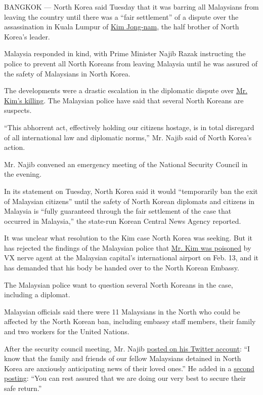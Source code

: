BANGKOK --- North Korea said Tuesday that it was barring all Malaysians
from leaving the country until there was a ``fair settlement'' of a
dispute over the assassination in Kuala Lumpur of
\href{https://www.nytimes.com/2017/02/15/world/asia/kim-jong-nam-assassination-north-korea.html}{Kim
Jong-nam}, the half brother of North Korea's leader.

Malaysia responded in kind, with Prime Minister Najib Razak instructing
the police to prevent all North Koreans from leaving Malaysia until he
was assured of the safety of Malaysians in North Korea.

The developments were a drastic escalation in the diplomatic dispute
over
\href{https://www.nytimes.com/2017/02/22/world/asia/kim-jong-nam-assassination-korea-malaysia.html}{Mr.
Kim's killing}. The Malaysian police have said that several North
Koreans are suspects.

``This abhorrent act, effectively holding our citizens hostage, is in
total disregard of all international law and diplomatic norms,'' Mr.
Najib said of North Korea's action.

Mr. Najib convened an emergency meeting of the National Security Council
in the evening.

In its statement on Tuesday, North Korea said it would ``temporarily ban
the exit of Malaysian citizens'' until the safety of North Korean
diplomats and citizens in Malaysia is ``fully guaranteed through the
fair settlement of the case that occurred in Malaysia,'' the state-run
Korean Central News Agency reported.

It was unclear what resolution to the Kim case North Korea was seeking.
But it has rejected the findings of the Malaysian police that
\href{https://www.nytimes.com/2017/03/02/world/asia/kim-jong-nam-malaysia.html}{Mr.
Kim was poisoned} by VX nerve agent at the Malaysian capital's
international airport on Feb. 13, and it has demanded that his body be
handed over to the North Korean Embassy.

The Malaysian police want to question several North Koreans in the case,
including a diplomat.

Malaysian officials said there were 11 Malaysians in the North who could
be affected by the North Korean ban, including embassy staff members,
their family and two workers for the United Nations.

After the security council meeting, Mr. Najib
\href{https://twitter.com/NajibRazak/status/839133732489441280}{posted
on his Twitter account}: ``I know that the family and friends of our
fellow Malaysians detained in North Korea are anxiously anticipating
news of their loved ones.'' He added in a
\href{https://twitter.com/NajibRazak/status/839135526946914304}{second
posting}: ``You can rest assured that we are doing our very best to
secure their safe return.''

